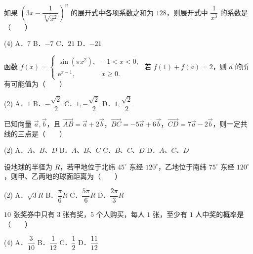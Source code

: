 \begin{question}
如果 $\left(3x - \dfrac{1}{\sqrt[3]{x^2}}\right)^n$ 的展开式中各项系数之和为 $128$，则展开式中 $\dfrac{1}{x^3}$ 的系数是\mbox{（　　）}

\begin{gkopts}(4)
\task A．$7$
\task B．$-7$
\task C．$21$
\task D．$-21$
\end{gkopts}

\end{question}
\begin{question}
函数 $f(x) = \begin{cases} \sin(\pi x^2), & -1 < x < 0, \\ \mathrm{e}^{x-1}, & x \geqslant 0. \end{cases}$ 若 $f(1) + f(a) = 2$，则 $a$ 的所有可能值为\mbox{（　　）}

\begin{gkopts}(2)
\task A．$1$
\task B．$-\dfrac{\sqrt{2}}{2}$
\task C．$1, -\dfrac{\sqrt{2}}{2}$
\task D．$1, \dfrac{\sqrt{2}}{2}$
\end{gkopts}

\end{question}
\begin{question}
已知向量 $\vec{a}, \vec{b}$，且 $\vec{AB} = \vec{a} + 2\vec{b}$，$\vec{BC} = -5\vec{a} + 6\vec{b}$，$\vec{CD} = 7\vec{a} - 2\vec{b}$，则一定共线的三点是\mbox{（　　）}

\begin{gkopts}(2)
\task A．$A$、$B$、$D$
\task B．$A$、$B$、$C$
\task C．$B$、$C$、$D$
\task D．$A$、$C$、$D$
\end{gkopts}

\end{question}
\begin{question}
设地球的半径为 $R$，若甲地位于北纬 $45^\circ$ 东经 $120^\circ$，乙地位于南纬 $75^\circ$ 东经 $120^\circ$，则甲、乙两地的球面距离为\mbox{（　　）}

\begin{gkopts}(2)
\task A．$\sqrt{3}R$
\task B．$\dfrac{\pi}{6}R$
\task C．$\dfrac{5\pi}{6}R$
\task D．$\dfrac{2\pi}{3}R$
\end{gkopts}

\end{question}
\begin{question}
$10$ 张奖券中只有 $3$ 张有奖，$5$ 个人购买，每人 $1$ 张，至少有 $1$ 人中奖的概率是\mbox{（　　）}

\begin{gkopts}(4)
\task A．$\dfrac{3}{10}$
\task B．$\dfrac{1}{12}$
\task C．$\dfrac{1}{2}$
\task D．$\dfrac{11}{12}$
\end{gkopts}

\end{question}
